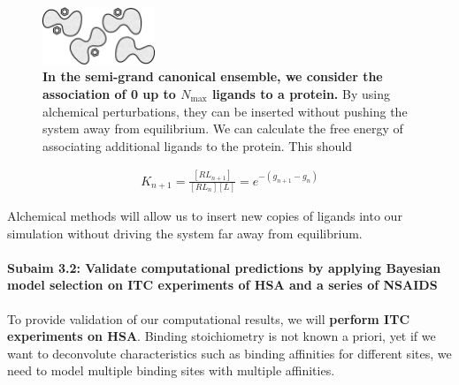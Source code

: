 \documentclass[10pt,final]{article}
\newcommand{\subsubsubsection}[1]{\paragraph*{#1}}
\begin{document}
\begin{figure}[H]
  \centering
  \includegraphics[width=0.3\textwidth]{figures/semi-grand2.png}
  \caption{\textbf{In the semi-grand canonical ensemble, we consider the association of 0 up to $N_\mathrm{max}$ ligands to a protein. }By using alchemical perturbations, they can be inserted without pushing the system away from equilibrium. We can calculate the free energy of associating additional ligands to the protein. This should }
  \label{figure:semigrand}
\end{figure}


\begin{align}
K_{n+1} = \frac{[RL_{n+1}]}{[RL_n][L]} = e^{-(g_{n+1}-g_n)}
\label{eq:K_eq}
\end{align}



Alchemical methods will allow us to insert new copies of ligands into our simulation without driving the system far away from equilibrium. 

\subsubsubsection{Subaim 3.2: Validate computational predictions by applying Bayesian model selection on ITC  experiments of HSA and a series of NSAIDS}
To provide validation of our computational results, we will \textbf{perform ITC experiments on HSA}. Binding stoichiometry is not known a priori, yet if we want to deconvolute characteristics such as binding affinities for different sites, we need to model multiple binding sites with multiple affinities.
\end{document}
